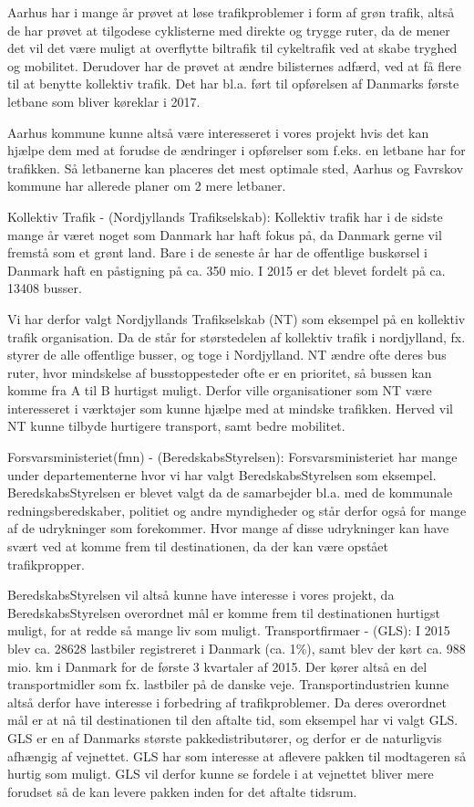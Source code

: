 Aarhus har i mange år prøvet at løse trafikproblemer i form af grøn trafik, altså de har prøvet at tilgodese cyklisterne med direkte og trygge ruter, da de mener det vil det være muligt at overflytte biltrafik til cykeltrafik ved at skabe tryghed og mobilitet. Derudover har de prøvet at ændre bilisternes adfærd, ved at få flere til at benytte kollektiv trafik. Det har bl.a. ført til opførelsen af Danmarks første letbane som bliver køreklar i 2017. 

Aarhus kommune kunne altså være interesseret i vores projekt hvis det kan hjælpe dem med at forudse de ændringer i opførelser som f.eks. en letbane har for trafikken. Så letbanerne kan placeres det mest optimale sted, Aarhus og Favrskov kommune har allerede planer om 2 mere letbaner.

Kollektiv Trafik - (Nordjyllands Trafikselskab):
Kollektiv trafik har i de sidste mange år været noget som Danmark har haft fokus på, da Danmark gerne vil fremstå som et grønt land. Bare i de seneste år har de offentlige buskørsel i Danmark haft en påstigning på ca. 350 mio. I 2015 er det blevet fordelt på ca. 13408 busser. 

Vi har derfor valgt Nordjyllands Trafikselskab (NT) som eksempel på en kollektiv trafik organisation. Da de står for størstedelen af kollektiv trafik i nordjylland, fx. styrer de alle offentlige busser, og toge i Nordjylland. NT ændre ofte deres bus ruter, hvor mindskelse af busstoppesteder ofte er en prioritet, så bussen kan komme fra A til B hurtigst muligt. Derfor ville organisationer som NT være interesseret i værktøjer som kunne hjælpe med at mindske trafikken. Herved vil NT kunne tilbyde hurtigere transport, samt bedre mobilitet.

Forsvarsministeriet(fmn) - (BeredskabsStyrelsen):
Forsvarsministeriet har mange under departementerne hvor vi har valgt BeredskabsStyrelsen som eksempel. BeredskabsStyrelsen er blevet valgt da de samarbejder bl.a. med de kommunale redningsberedskaber, politiet og andre myndigheder og står derfor også for mange af de udrykninger som forekommer. Hvor mange af disse udrykninger kan have svært ved at komme frem til destinationen, da der kan være opstået trafikpropper.

BeredskabsStyrelsen vil altså kunne have interesse i vores projekt, da BeredskabsStyrelsen overordnet mål er komme frem til destinationen hurtigst muligt, for at redde så mange liv som muligt. 
Transportfirmaer - (GLS):
I 2015 blev ca. 28628 lastbiler registreret i Danmark (ca. 1\%), samt blev der kørt ca. 988 mio. km i Danmark for de første 3 kvartaler af 2015. Der kører altså en del transportmidler som fx. lastbiler på de danske veje. Transportindustrien kunne altså derfor have interesse i forbedring af trafikproblemer. Da deres overordnet mål er at nå til destinationen til den aftalte tid, som eksempel har vi valgt GLS. GLS er en af Danmarks største pakkedistributører, og derfor er de naturligvis afhængig af vejnettet. GLS har som interesse at aflevere pakken til modtageren så hurtig som muligt. GLS vil derfor kunne se fordele i at vejnettet bliver mere forudset så de kan levere pakken inden for det aftalte tidsrum.

